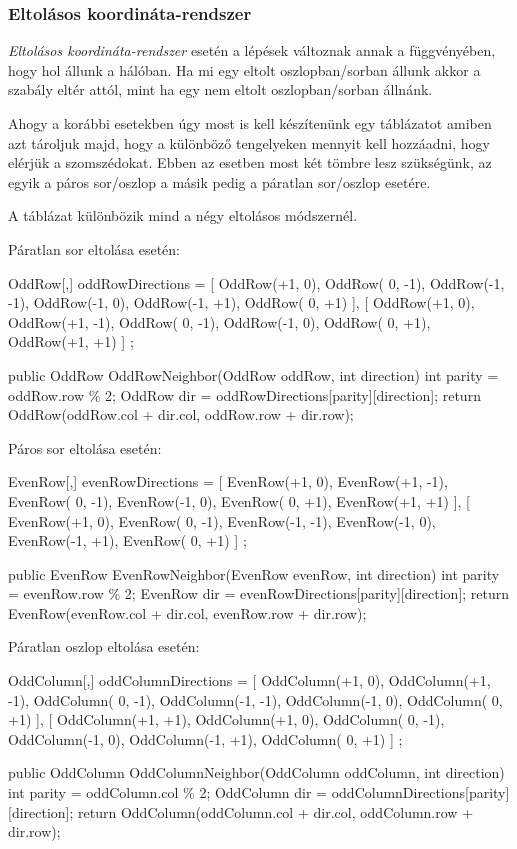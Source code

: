 \subsubsection{Eltolásos koordináta-rendszer}
\cite{redblobgamesHexagonalGrids}

\textit{Eltolásos koordináta-rendszer} esetén a lépések változnak annak a függvényében, hogy hol állunk a hálóban. Ha mi egy eltolt oszlopban/sorban állunk akkor a szabály eltér attól, mint ha egy nem eltolt oszlopban/sorban állnánk.

Ahogy a korábbi esetekben úgy most is kell készítenünk egy táblázatot amiben azt tároljuk majd, hogy a különböző tengelyeken mennyit kell hozzáadni, hogy elérjük a szomszédokat. Ebben az esetben most két tömbre lesz szükségünk, az egyik a páros sor/oszlop a másik pedig a páratlan sor/oszlop esetére.

A táblázat különbözik mind a négy eltolásos módszernél.

\bigskip

Páratlan sor eltolása esetén:
\begin{cpp}
OddRow[,] oddRowDirections = 
{ 
   [ 
      OddRow(+1,  0), OddRow( 0, -1), OddRow(-1, -1),
      OddRow(-1,  0), OddRow(-1, +1), OddRow( 0, +1) 
   ],
   [ 
      OddRow(+1,  0), OddRow(+1, -1), OddRow( 0, -1),
      OddRow(-1,  0), OddRow( 0, +1), OddRow(+1, +1) 
   ]
};

public OddRow OddRowNeighbor(OddRow oddRow, int direction)
{
   int parity = oddRow.row \% 2;
   OddRow dir = oddRowDirections[parity][direction];
   return OddRow(oddRow.col + dir.col, oddRow.row + dir.row);
}   
\end{cpp}

Páros sor eltolása esetén:
\begin{cpp}  
EvenRow[,] evenRowDirections = 
{ 
   [
      EvenRow(+1,  0), EvenRow(+1, -1), EvenRow( 0, -1),
      EvenRow(-1,  0), EvenRow( 0, +1), EvenRow(+1, +1) 
   ],
   [ 
      EvenRow(+1,  0), EvenRow( 0, -1), EvenRow(-1, -1),
      EvenRow(-1,  0), EvenRow(-1, +1), EvenRow( 0, +1) 
   ]
};

public EvenRow EvenRowNeighbor(EvenRow evenRow, int direction)
{
   int parity = evenRow.row \% 2;
   EvenRow dir = evenRowDirections[parity][direction];
   return EvenRow(evenRow.col + dir.col, evenRow.row + dir.row);
}   
\end{cpp}

Páratlan oszlop eltolása esetén:
\begin{cpp}
OddColumn[,] oddColumnDirections = 
{ 
   [ 
      OddColumn(+1,  0), OddColumn(+1, -1), OddColumn( 0, -1),
      OddColumn(-1, -1), OddColumn(-1,  0), OddColumn( 0, +1) 
   ],
   [ 
      OddColumn(+1, +1), OddColumn(+1,  0), OddColumn( 0, -1),
      OddColumn(-1,  0), OddColumn(-1, +1), OddColumn( 0, +1) 
   ]
};

public OddColumn OddColumnNeighbor(OddColumn oddColumn, int direction)
{
   int parity = oddColumn.col \% 2;
   OddColumn dir = oddColumnDirections[parity][direction];
   return OddColumn(oddColumn.col + dir.col, oddColumn.row + dir.row);
}   
\end{cpp}

